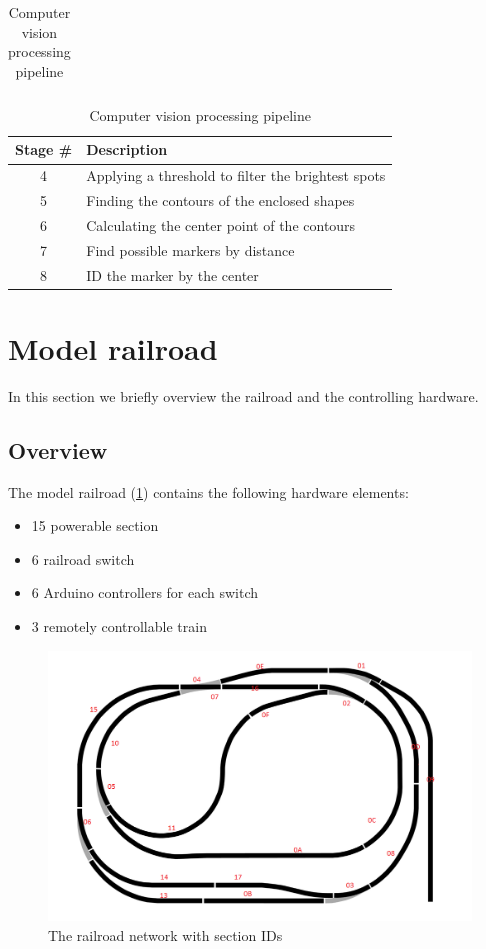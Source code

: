 \begin{table}[p]
\begin{tabularx}{\textwidth}{cm{5cm}X}
	\end{tabularx}
	\begin{tabularx}{\textwidth}{cX}
		\toprule
		Stage \# & Description  \\
		\midrule
		4 & Applying a threshold to filter the brightest spots \\
		5 & Finding the contours of the enclosed shapes \\
		6 & Calculating the center point of the contours \\
		7 & Find possible markers by distance \\
		8 & ID the marker by the center \\
		\bottomrule
	\end{tabularx}
	\caption{Computer vision processing pipeline}
	\label{table:case_study:pipeline}
\end{table}

\newpage
\section{Model railroad}
In this section we briefly overview the railroad and the controlling hardware.

\subsection{Overview}

\noindent The model railroad (\cref{fig:case_study:total_map}) contains the following hardware elements:
\begin{itemize}
	\item 15 powerable section
	\item 6 railroad switch
	\item 6 Arduino controllers for each switch
	\item 3 remotely controllable train
\end{itemize}

\begin{figure}[h]
	\centering
	\includegraphics[width=0.8\linewidth]{include/figures/chapter_6/total_view_1}
	\caption{The railroad network with section IDs}
	\label{fig:case_study:total_map}
\end{figure}

